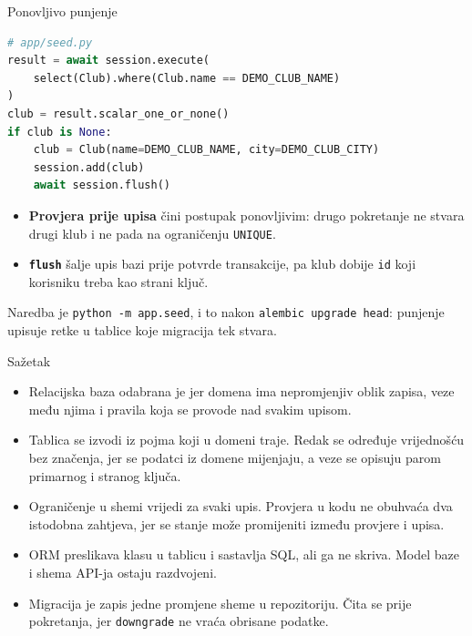 \begin{frame}[fragile]{Ponovljivo punjenje}
\begin{lstlisting}[language=python]
# app/seed.py
result = await session.execute(
    select(Club).where(Club.name == DEMO_CLUB_NAME)
)
club = result.scalar_one_or_none()
if club is None:
    club = Club(name=DEMO_CLUB_NAME, city=DEMO_CLUB_CITY)
    session.add(club)
    await session.flush()
\end{lstlisting}

\vspace{0.2em}
\begin{itemize}
  \item \textbf{Provjera prije upisa} čini postupak ponovljivim: drugo pokretanje ne stvara drugi klub i ne pada na ograničenju \texttt{UNIQUE}.
  \item \textbf{\texttt{flush}} šalje upis bazi prije potvrde transakcije, pa klub dobije \texttt{id} koji korisniku treba kao strani ključ.
\end{itemize}

\vspace{0.2em}
Naredba je \texttt{python -m app.seed}, i to nakon \texttt{alembic upgrade head}: punjenje upisuje retke u tablice koje migracija tek stvara.
\end{frame}

\begin{frame}{Sažetak}
\begin{itemize}
  \item Relacijska baza odabrana je jer domena ima nepromjenjiv oblik zapisa, veze među njima i pravila koja se provode nad svakim upisom.
  \item Tablica se izvodi iz pojma koji u domeni traje. Redak se određuje vrijednošću bez značenja, jer se podatci iz domene mijenjaju, a veze se opisuju parom primarnog i stranog ključa.
  \item Ograničenje u shemi vrijedi za svaki upis. Provjera u kodu ne obuhvaća dva istodobna zahtjeva, jer se stanje može promijeniti između provjere i upisa.
  \item ORM preslikava klasu u tablicu i sastavlja SQL, ali ga ne skriva. Model baze i shema API-ja ostaju razdvojeni.
  \item Migracija je zapis jedne promjene sheme u repozitoriju. Čita se prije pokretanja, jer \texttt{downgrade} ne vraća obrisane podatke.
\end{itemize}
\end{frame}


